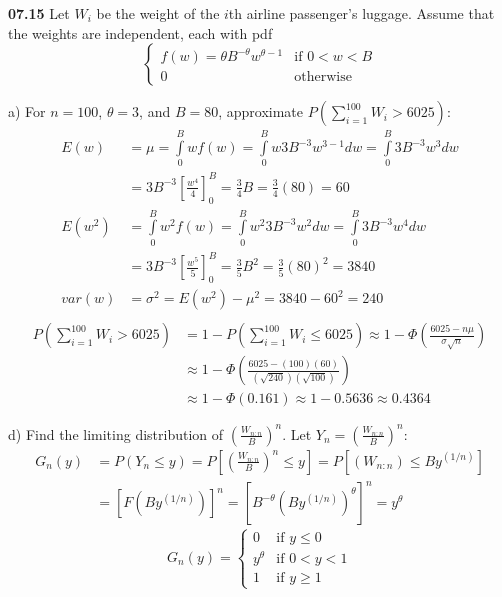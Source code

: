 
{ \bf 07.15 }
Let $W_i$ be the weight of the $i$th airline passenger's luggage. Assume that the weights are independent, each with pdf
\[
\begin{cases}
f(w) = \theta B^{-\theta} w^{\theta-1} & \text{if } 0 < w < B \\
0 & \text{otherwise}
\end{cases}
\]

a) For $n = 100$, $\theta = 3$, and $B = 80$, approximate $P\left( \sum\limits^{100}_{i=1} W_i > 6025 \right)$:
\begin{align*}
E(w) &= \mu = \int\limits^B_0 w f(w) = \int\limits^B_0 w 3 B^{-3} w^{3-1} dw = \int\limits^B_0 3 B^{-3} w^3 dw \\
  &= 3 B^{-3} \left[\frac{w^4}{4}\right]^B_0 = \frac{3}{4} B = \frac{3}{4} (80) = 60 \\
E(w^2) &= \int\limits^B_0 w^2 f(w) = \int\limits^B_0 w^2 3 B^{-3} w^2 dw = \int\limits^B_0 3 B^{-3} w^4 dw \\
  &= 3 B^{-3} \left[\frac{w^5}{5}\right]^B_0 = \frac{3}{5} B^2 = \frac{3}{5} (80)^2 = 3840 \\
var(w)  &= \sigma^2 = E(w^2) - \mu^2 = 3840 - 60^2 = 240 \\
\end{align*}
\begin{align*}
P\left( \sum\limits^{100}_{i=1} W_i > 6025 \right) &= 1 - P\left( \sum\limits^{100}_{i=1} W_i \le 6025 \right) 
  \approx 1 - \Phi\left( \frac{6025 - n\mu}{\sigma \sqrt{n}} \right) \\
  &\approx 1 - \Phi\left( \frac{6025 - (100)(60)}{\left(\sqrt{240}\right) \left(\sqrt{100}\right)} \right) \\
  &\approx 1 - \Phi(0.161) \approx 1 - 0.5636 \approx 0.4364
\end{align*}

d) Find the limiting distribution of $\left( \frac{W_{n:n}}{B}\right)^n$. Let $Y_n = \left( \frac{W_{n:n}}{B}\right)^n$:
\begin{align*}
G_n(y) &= P\left(Y_n \le y \right) = P\left[ \left( \frac{W_{n:n}}{B} \right)^n \le y \right]
  = P\left[ \left( W_{n:n} \right) \le B y^{(1/n)} \right] \\
  &= \left[ F\left( B y^{(1/n)} \right) \right]^n
  = \left[ B^{-\theta} \left(B y^{(1/n)} \right)^\theta \right]^n = y^\theta
\end{align*}
\[
G_n(y) =
\begin{cases}
0 & \text{if } y \le 0 \\
y^\theta & \text{if } 0 < y < 1 \\
1 & \text{if } y \ge 1
\end{cases}
\]

